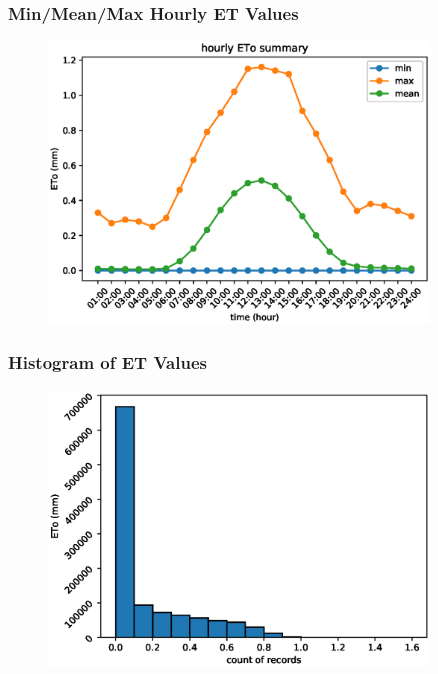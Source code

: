 \begin{frame}
\frametitle{Min/Mean/Max Hourly ET Values}
\begin{figure}
\includegraphics[width=0.9\textwidth]{images/summary-hourly-eto-values}
\end{figure}
\end{frame}

\begin{frame}
\frametitle{Histogram of ET Values}
\begin{figure}
\includegraphics[width=0.9\textwidth]{images/hist-eto}
\end{figure}
\end{frame}
